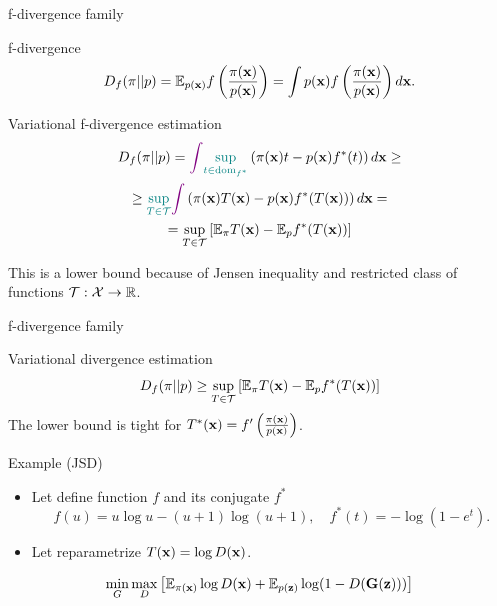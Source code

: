 \begin{frame}{f-divergence family}
	\vspace{-0.4cm}
	\begin{block}{f-divergence}
		\vspace{-0.3cm}
		\[
		D_f(\pi || p) = \mathbb{E}_{p(\mathbf{x})}  f\left( \frac{\pi(\mathbf{x})}{p(\mathbf{x})} \right)  = \int p(\mathbf{x}) f\left( \frac{\pi(\mathbf{x})}{p(\mathbf{x})} \right) d \mathbf{x}.
		\]
		\vspace{-0.4cm}
	\end{block}
	\begin{block}{Variational f-divergence estimation}
		\vspace{-0.8cm}
		\begin{multline*}
			D_f(\pi || p)  = {\color{violet}\int} {\color{teal} \sup_{t \in \text{dom}_{f^*}}} \left( \pi(\mathbf{x})t - p(\mathbf{x}) f^*(t) \right) d \mathbf{x} \geq \\
			 \geq {\color{teal}\sup_{T \in \mathcal{T}}} {\color{violet}\int} \left( \pi(\mathbf{x})T(\mathbf{x}) - p(\mathbf{x}) f^*(T(\mathbf{x})) \right) d \mathbf{x} = \\
			 = \sup_{T \in \mathcal{T}} \left[\mathbb{E}_{\pi}T(\mathbf{x}) -  \mathbb{E}_p f^*(T(\mathbf{x})) \right]
		\end{multline*}
	\vspace{-0.6cm}
	\end{block}
	This is a lower bound because of Jensen inequality and restricted class of functions $\mathcal{T}: \mathcal{X} \rightarrow \mathbb{R}$. 
	
\end{frame}
\begin{frame}{f-divergence family}
	\begin{block}{Variational divergence estimation}
		\[
			D_f(\pi || p) \geq \sup_{T \in \mathcal{T}} \left[\mathbb{E}_{\pi}T(\mathbf{x}) -  \mathbb{E}_p f^*(T(\mathbf{x})) \right]
		\]
		The lower bound is tight for $T^*(\mathbf{x}) = f'\left( \frac{\pi(\mathbf{x})}{p(\mathbf{x})} \right)$.
	\end{block}
	\begin{block}{Example (JSD)}
		\begin{itemize}
			\item Let define function $f$ and its conjugate $f^*$
			\[ 
				f(u) = u \log u - (u + 1) \log (u + 1), \quad f^*(t) = - \log (1 - e^t).
			\]
			\item Let reparametrize $T(\mathbf{x}) = \log D(\mathbf{x})$.
		\end{itemize}
		\vspace{-0.4cm}
	\end{block}
	\[
		\min_{G} \max_D \left[ \mathbb{E}_{\pi(\mathbf{x})} \log D(\mathbf{x}) + \mathbb{E}_{p(\mathbf{z})} \log (1 - D(\mathbf{G}(\mathbf{z}))) \right]
	\]

\end{frame}
